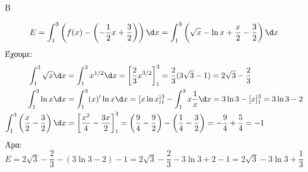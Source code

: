\begin{thema}{Β}
\begin{erwthma}
\[ E = \int_1^3 \left( f(x) - \left(-\dfrac{1}{2}x + \dfrac{3}{2}\right) \right) \d x = \int_1^3 \left( \sqrt{x} - \ln x + \dfrac{x}{2} - \dfrac{3}{2} \right) \d x \]
Έχουμε:
\begin{align*}
\int_1^3 \sqrt{x} \d x &= \int_1^3 x^{1/2} \d x = \left[ \dfrac{2}{3} x^{3/2} \right]_1^3 = \dfrac{2}{3} (3\sqrt{3} - 1) = 2\sqrt{3} - \dfrac{2}{3} \\
\int_1^3 \ln x \d x &= \int_1^3 (x)' \ln x \d x = [x \ln x]_1^3 - \int_1^3 x \dfrac{1}{x} \d x = 3\ln 3 - [x]_1^3 = 3\ln 3 - 2 \\
\int_1^3 \left( \dfrac{x}{2} - \dfrac{3}{2} \right) \d x &= \left[ \dfrac{x^2}{4} - \dfrac{3x}{2} \right]_1^3 = \left( \dfrac{9}{4} - \dfrac{9}{2} \right) - \left( \dfrac{1}{4} - \dfrac{3}{2} \right) = -\dfrac{9}{4} + \dfrac{5}{4} = -1
\end{align*}
Άρα:
\[ E = 2\sqrt{3} - \dfrac{2}{3} - (3\ln 3 - 2) - 1 = 2\sqrt{3} - \dfrac{2}{3} - 3\ln 3 + 2 - 1 = 2\sqrt{3} - 3\ln 3 + \dfrac{1}{3} \]
\end{erwthma}
\end{thema}


